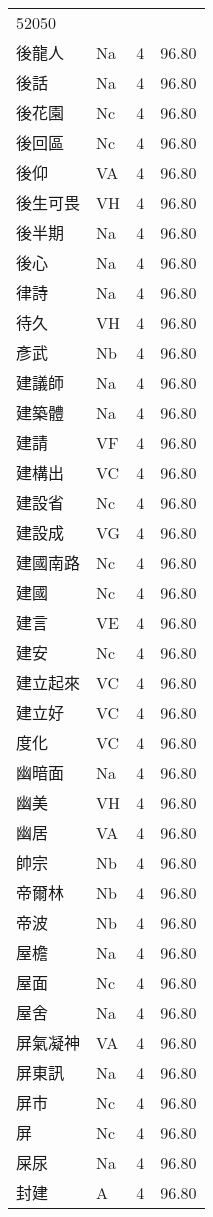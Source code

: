 \documentclass[twocolumn]{book}
\begin{document}
\begin{supertabular}{llrr}
52050\\
後龍人 & Na & 4 &  96.80\\
後話 & Na & 4 &  96.80\\
後花園 & Nc & 4 &  96.80\\
後回區 & Nc & 4 &  96.80\\
後仰 & VA & 4 &  96.80\\
後生可畏 & VH & 4 &  96.80\\
後半期 & Na & 4 &  96.80\\
後心 & Na & 4 &  96.80\\
律詩 & Na & 4 &  96.80\\
待久 & VH & 4 &  96.80\\
彥武 & Nb & 4 &  96.80\\
建議師 & Na & 4 &  96.80\\
建築體 & Na & 4 &  96.80\\
建請 & VF & 4 &  96.80\\
建構出 & VC & 4 &  96.80\\
建設省 & Nc & 4 &  96.80\\
建設成 & VG & 4 &  96.80\\
建國南路 & Nc & 4 &  96.80\\
建國 & Nc & 4 &  96.80\\
建言 & VE & 4 &  96.80\\
建安 & Nc & 4 &  96.80\\
建立起來 & VC & 4 &  96.80\\
建立好 & VC & 4 &  96.80\\
度化 & VC & 4 &  96.80\\
幽暗面 & Na & 4 &  96.80\\
幽美 & VH & 4 &  96.80\\
幽居 & VA & 4 &  96.80\\
帥宗 & Nb & 4 &  96.80\\
帝爾林 & Nb & 4 &  96.80\\
帝波 & Nb & 4 &  96.80\\
屋檐 & Na & 4 &  96.80\\
屋面 & Nc & 4 &  96.80\\
屋舍 & Na & 4 &  96.80\\
屏氣凝神 & VA & 4 &  96.80\\
屏東訊 & Na & 4 &  96.80\\
屏市 & Nc & 4 &  96.80\\
屏 & Nc & 4 &  96.80\\
屎尿 & Na & 4 &  96.80\\
封建 & A & 4 &  96.80\\

\end{supertabular}
\end{document}
